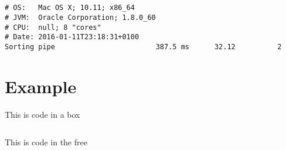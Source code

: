 \documentclass{ituhandin}
\begin{document}
\section{}
\begin{lstlisting}[language={},frame={}]
# OS:   Mac OS X; 10.11; x86_64
# JVM:  Oracle Corporation; 1.8.0_60
# CPU:  null; 8 "cores"
# Date: 2016-01-11T23:18:31+0100
Sorting pipe                        387.5 ms      32.12          2
\end{lstlisting}
\chapter{} %
\chapter{} %

\chapter*{Example}

This is code in a box

\begin{lstlisting}[caption=This is a caption]
\end{lstlisting}


This is code in the free

\begin{lstlisting}[frame={}]
\end{lstlisting}




\label{LastPage}
\end{document}
